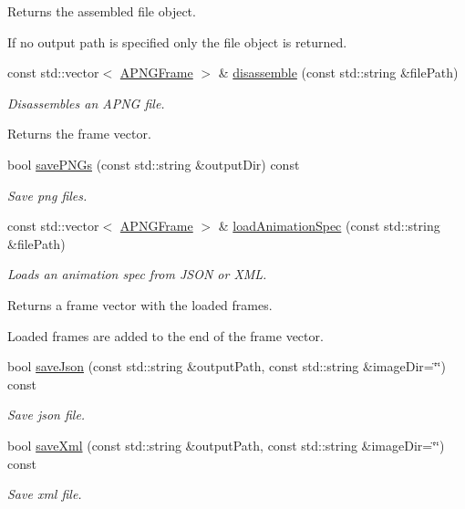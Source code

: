 \begin{DoxyCompactItemize}
\begin{DoxyCompactList}
 Returns the assembled file object.\par
 If no output path is specified only the file object is returned. \end{DoxyCompactList}\item 
const std\-::vector$<$ \hyperlink{classapngasm_1_1APNGFrame}{A\-P\-N\-G\-Frame} $>$ \& \hyperlink{classapngasm_1_1APNGAsm_ab905012a98e04946623252b5561453aa}{disassemble} (const std\-::string \&file\-Path)
\begin{DoxyCompactList}\small\item\em Disassembles an A\-P\-N\-G file.\par
 Returns the frame vector. \end{DoxyCompactList}\item 
bool \hyperlink{classapngasm_1_1APNGAsm_a59ebac9f6db6973bc8e5b5d05e72586f}{save\-P\-N\-Gs} (const std\-::string \&output\-Dir) const 
\begin{DoxyCompactList}\small\item\em Save png files. \end{DoxyCompactList}\item 
const std\-::vector$<$ \hyperlink{classapngasm_1_1APNGFrame}{A\-P\-N\-G\-Frame} $>$ \& \hyperlink{classapngasm_1_1APNGAsm_acf09916f78025c714a205142cdae1349}{load\-Animation\-Spec} (const std\-::string \&file\-Path)
\begin{DoxyCompactList}\small\item\em Loads an animation spec from J\-S\-O\-N or X\-M\-L.\par
 Returns a frame vector with the loaded frames.\par
 Loaded frames are added to the end of the frame vector. \end{DoxyCompactList}\item 
bool \hyperlink{classapngasm_1_1APNGAsm_ae85225d19784fe0681ab88b9220901ab}{save\-Json} (const std\-::string \&output\-Path, const std\-::string \&image\-Dir=\char`\"{}\char`\"{}) const 
\begin{DoxyCompactList}\small\item\em Save json file. \end{DoxyCompactList}\item 
bool \hyperlink{classapngasm_1_1APNGAsm_ae92bb6d35d573b8609cd06b80c92cc34}{save\-Xml} (const std\-::string \&output\-Path, const std\-::string \&image\-Dir=\char`\"{}\char`\"{}) const 
\begin{DoxyCompactList}\small\item\em Save xml file. \end{DoxyCompactList}\item 

\end{DoxyCompactItemize}
